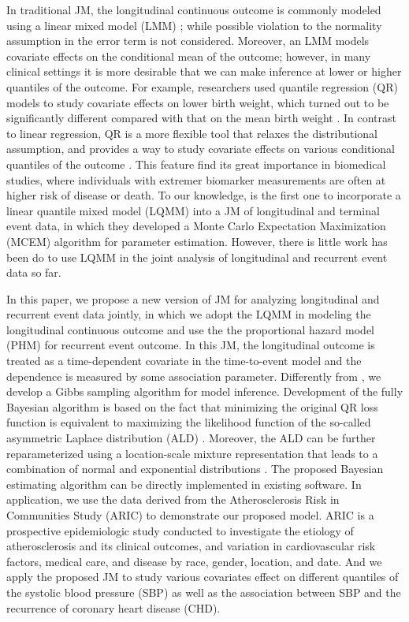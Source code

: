 In traditional JM, the longitudinal continuous outcome is commonly modeled using a linear mixed model (LMM) \citep{laird1982random}; while possible violation to the normality assumption in the error term is not considered. Moreover, an LMM  models covariate effects on the conditional mean of the outcome; however, in many clinical settings it is more desirable that we can make inference at lower or higher quantiles of the outcome. For example, researchers used quantile regression (QR) models to study covariate effects on lower birth weight, which turned out to be significantly different compared with that on the mean birth weight \citep{koenker2001quantile}. In contrast to linear regression, QR is a more flexible tool that relaxes the distributional assumption, and provides a way to study covariate effects on various conditional quantiles of the outcome \citep{koenker2005quantile}. This feature find its great importance in biomedical studies, where individuals with extremer biomarker measurements are often at higher risk of disease or death. To our knowledge, \cite{farcomeni2015longitudinal} is the first one to incorporate a linear quantile mixed model (LQMM) into a JM of longitudinal and terminal event data, in which they developed a Monte Carlo Expectation Maximization (MCEM) algorithm for parameter estimation. However, there is little work has been do to use LQMM in the joint analysis of longitudinal and recurrent event data so far.

In this paper, we propose a new version of JM for analyzing longitudinal and recurrent event data jointly, in which we adopt the LQMM in modeling the longitudinal continuous outcome and use the the proportional hazard model (PHM) for recurrent event outcome. In this JM, the longitudinal outcome is treated as a time-dependent covariate in the time-to-event model and the dependence is measured by some association parameter. Differently from \cite{farcomeni2015longitudinal}, we develop a Gibbs sampling algorithm for model inference. Development of the fully Bayesian algorithm is based on the fact that minimizing the original QR loss function is equivalent to maximizing the likelihood function of the so-called asymmetric Laplace distribution (ALD) \citep{yu2001bayesian}. Moreover, the ALD can be further reparameterized using a location-scale mixture representation that leads to a combination of normal and exponential distributions \citep{kotz2001laplace, kozumi2011gibbs}. The proposed Bayesian estimating algorithm can be directly implemented in existing software. In application, we use the data derived from the Atherosclerosis Risk in Communities Study (ARIC) to demonstrate our proposed model. ARIC is a prospective epidemiologic study conducted to investigate the etiology of atherosclerosis and its clinical outcomes, and variation in cardiovascular risk factors, medical care, and disease by race, gender, location, and date. And we apply the proposed JM to study various covariates effect on different quantiles of the systolic blood pressure (SBP) as well as the association between SBP and the recurrence of coronary heart disease (CHD).


